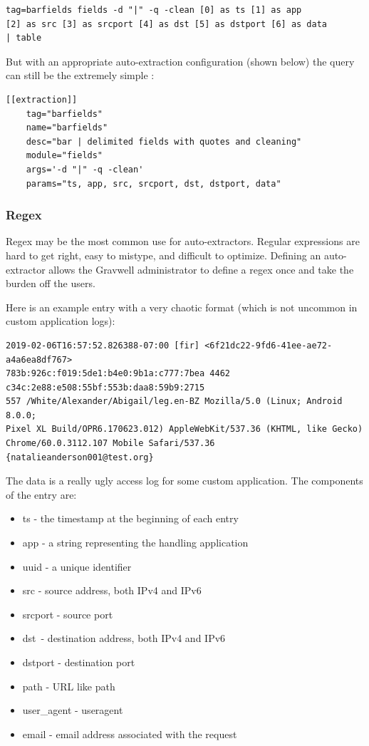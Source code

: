 \begin{Verbatim}[breaklines=true]
tag=barfields fields -d "|" -q -clean [0] as ts [1] as app 
[2] as src [3] as srcport [4] as dst [5] as dstport [6] as data
| table
\end{Verbatim}

But with an appropriate auto-extraction configuration (shown below) the
query can still be the extremely simple :

\begin{Verbatim}[breaklines=true]
[[extraction]]
    tag="barfields"
    name="barfields"
    desc="bar | delimited fields with quotes and cleaning"
    module="fields"
    args='-d "|" -q -clean'
    params="ts, app, src, srcport, dst, dstport, data"
\end{Verbatim}

\subsubsection{Regex}

Regex may be the most common use for auto-extractors. Regular
expressions are hard to get right, easy to mistype, and difficult to
optimize. Defining an auto-extractor allows the Gravwell administrator
to define a regex once and take the burden off the users.

Here is an example entry with a very chaotic format (which is not
uncommon in custom application logs):

\begin{Verbatim}[breaklines=true]
2019-02-06T16:57:52.826388-07:00 [fir] <6f21dc22-9fd6-41ee-ae72-a4a6ea8df767> 
783b:926c:f019:5de1:b4e0:9b1a:c777:7bea 4462 c34c:2e88:e508:55bf:553b:daa8:59b9:2715 
557 /White/Alexander/Abigail/leg.en-BZ Mozilla/5.0 (Linux; Android 8.0.0; 
Pixel XL Build/OPR6.170623.012) AppleWebKit/537.36 (KHTML, like Gecko) 
Chrome/60.0.3112.107 Mobile Safari/537.36 {natalieanderson001@test.org}
\end{Verbatim}

The data is a really ugly access log for some custom application. The
components of the entry are:

\begin{itemize}
\tightlist
\item
  {ts - the timestamp at the beginning of each entry}
\item
  {app - a string representing the handling application}
\item
  {uuid - a unique identifier}
\item
  {src - source address, both IPv4 and IPv6}
\item
  {srcport - source port}
\item
  {dst}{~- destination address, both IPv4 and IPv6}
\item
  {dstport - destination port}
\item
  {path - URL like path}
\item
  {user\_agent - useragent}
\item
  {email - email address associated with the request}
\end{itemize}

